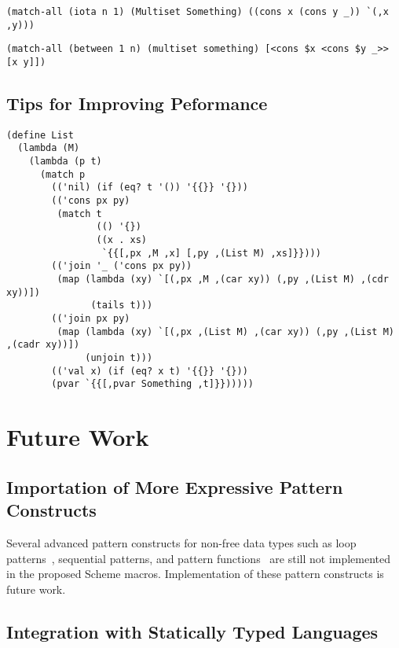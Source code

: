 \documentclass[acmlarge]{acmart}
\begin{document}
\medskip

\begin{lstlisting}[language=egison]
(match-all (iota n 1) (Multiset Something) ((cons x (cons y _)) `(,x ,y)))
\end{lstlisting}

\begin{lstlisting}[language=egison]
(match-all (between 1 n) (multiset something) [<cons $x <cons $y _>> [x y]])
\end{lstlisting}

\subsection{Tips for Improving Peformance}

\begin{lstlisting}[language=egison]
(define List
  (lambda (M)
    (lambda (p t)
      (match p
        (('nil) (if (eq? t '()) '{{}} '{}))
        (('cons px py)
         (match t
                (() '{})
                ((x . xs)
                 `{{[,px ,M ,x] [,py ,(List M) ,xs]}})))
        (('join '_ ('cons px py))
         (map (lambda (xy) `[(,px ,M ,(car xy)) (,py ,(List M) ,(cdr xy))])
               (tails t)))
        (('join px py)
         (map (lambda (xy) `[(,px ,(List M) ,(car xy)) (,py ,(List M) ,(cadr xy))])
              (unjoin t)))
        (('val x) (if (eq? x t) '{{}} '{}))
        (pvar `{{[,pvar Something ,t]}})))))
\end{lstlisting}

\section{Future Work}\label{future}

\subsection{Importation of More Expressive Pattern Constructs}

Several advanced pattern constructs for non-free data types such as loop patterns~\cite{egi2018loop}, sequential patterns, and pattern functions~\cite{egisonPat} are still not implemented in the proposed Scheme macros.
Implementation of these pattern constructs is future work.

\subsection{Integration with Statically Typed Languages}
\end{document}
